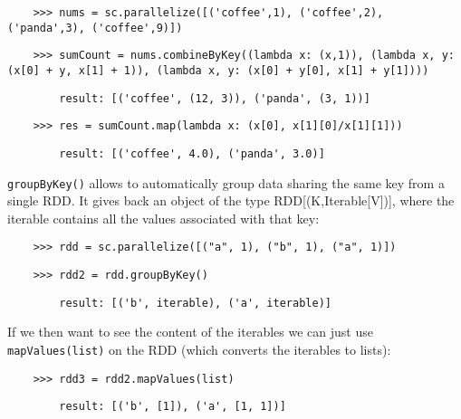 \begin{lstlisting}
    >>> nums = sc.parallelize([('coffee',1), ('coffee',2), ('panda',3), ('coffee',9)])
\end{lstlisting}

\begin{lstlisting}
    >>> sumCount = nums.combineByKey((lambda x: (x,1)), (lambda x, y: (x[0] + y, x[1] + 1)), (lambda x, y: (x[0] + y[0], x[1] + y[1])))
\end{lstlisting}

\begin{lstlisting}
        result: [('coffee', (12, 3)), ('panda', (3, 1))]
\end{lstlisting}

\begin{lstlisting}
    >>> res = sumCount.map(lambda x: (x[0], x[1][0]/x[1][1]))
\end{lstlisting}

\begin{lstlisting}
        result: [('coffee', 4.0), ('panda', 3.0)]
\end{lstlisting}


\texttt{groupByKey()} allows to automatically group data sharing the same key from a single RDD. It gives back an object of the type RDD[(K,Iterable[V])], where the iterable contains all the values associated with that key:

\begin{lstlisting}
    >>> rdd = sc.parallelize([("a", 1), ("b", 1), ("a", 1)])
\end{lstlisting}

\begin{lstlisting}
    >>> rdd2 = rdd.groupByKey()
\end{lstlisting}

\begin{lstlisting}
        result: [('b', iterable), ('a', iterable)]
\end{lstlisting}

If we then want to see the content of the iterables we can just use \texttt{mapValues(list)} on the RDD (which converts the iterables to lists):

\begin{lstlisting}
    >>> rdd3 = rdd2.mapValues(list)
\end{lstlisting}

\begin{lstlisting}
        result: [('b', [1]), ('a', [1, 1])]
\end{lstlisting}


